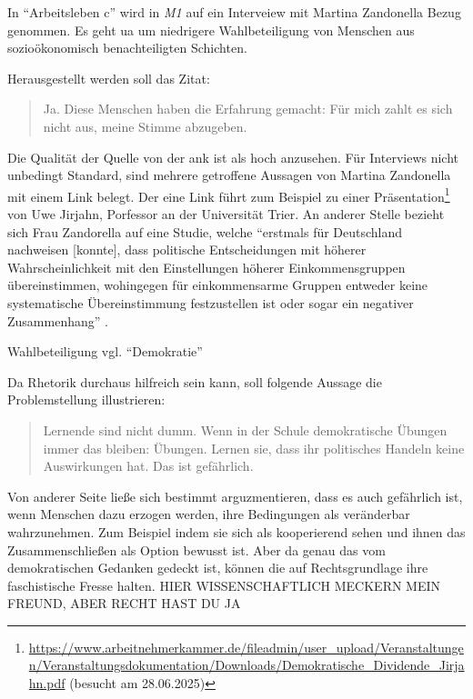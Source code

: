 In \enquote{Arbeitsleben c} wird in \emph{M1} auf ein Interveiew mit Martina Zandonella \autocite{Zandonella.2024} Bezug genommen. Es geht \gls{ua} um niedrigere Wahlbeteiligung von Menschen aus sozioökonomisch benachteiligten Schichten.

Herausgestellt werden soll das Zitat:
\begin{quote}
    Ja. Diese Menschen haben die Erfahrung gemacht: Für mich zahlt es sich nicht aus, meine Stimme abzugeben.   
\end{quote}

Die Qualität der Quelle von der \gls{ank} ist als hoch anzusehen. Für Interviews nicht unbedingt Standard, sind mehrere getroffene Aussagen von Martina Zandonella mit einem Link belegt. Der eine Link führt zum Beispiel zu einer Präsentation\footnote{
    \url{https://www.arbeitnehmerkammer.de/fileadmin/user_upload/Veranstaltungen/Veranstaltungsdokumentation/Downloads/Demokratische_Dividende_Jirjahn.pdf} (besucht am 28.06.2025)
} von Uwe Jirjahn, Porfessor an der Universität Trier. An anderer Stelle bezieht sich Frau Zandorella auf eine Studie, welche 
\enquote{erstmals für Deutschland nachweisen [konnte], dass politische Entscheidungen mit höherer Wahrscheinlichkeit mit den Einstellungen höherer Einkommensgruppen übereinstimmen, wohingegen für einkommensarme Gruppen entweder keine systematische Übereinstimmung festzustellen ist oder sogar ein negativer Zusammenhang} \autocite[177]{Elsasser.2017}.


Wahlbeteiligung vgl. \enquote{Demokratie}

Da Rhetorik durchaus hilfreich sein kann, soll folgende Aussage die Problemstellung illustrieren:
\begin{quote}
    Lernende sind nicht dumm. Wenn in der Schule demokratische Übungen immer das bleiben: Übungen. Lernen sie, dass ihr politisches Handeln keine Auswirkungen hat. Das ist gefährlich.
\end{quote}

Von anderer Seite ließe sich bestimmt arguzmentieren, dass es auch gefährlich ist, wenn Menschen dazu erzogen werden, ihre Bedingungen als veränderbar wahrzunehmen. Zum Beispiel indem sie sich als kooperierend sehen und ihnen das Zusammenschließen als Option bewusst ist.
Aber da genau das vom demokratischen Gedanken gedeckt ist, können die auf Rechtsgrundlage ihre faschistische Fresse halten. HIER WISSENSCHAFTLICH MECKERN MEIN FREUND, ABER RECHT HAST DU JA


